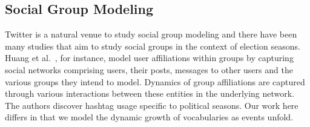 \begin{comment}
\subsection{Flawed Studies?}
Recent coverage of election forecasting using Twitter has been critical, e.g.,
see~\cite{metaxas2011not,gayo2012wanted}
These publications not only list pertinent problems
in using Twitter to forecast elections but also detail recommendations on how to make such methodologies better.
Gayo-Avello surveys %
the state-of-the-art approaches in predicting elections, 
most of which have been detailed above.
Gayo-Avello argues that post-hoc analysis of elections in retrospect must not count as valid predictions and that researchers 
must be wary of the \emph{file drawer} effect, i.e., the act of filing away negative results and publishing 
only the positive results. His major points of contention against such models are:
lack of explainability, no direct way to model a `vote' in social media, self-selection bias,
unrepresentativeness of Twitter demographics, lack of sophisticated sentiment modeling strategies
(e.g., to detect humor and sarcasm that abound in political conversations), and inability to capture
indifferences among the voting public (i.e., 
abstaining from tweeting about politics can carry as much signal as explicit mentions
of candidates). Finally, it has been shown that many of these models %
do not outperform a simple
base model that forecasts success for the incumbent.
Our approach here is to aid in better modeling of social groups and improve such predictions.
A truly comprehensive system will utilize social media as just one of its strategies in forecasting and
we do not make any claims of developing a universal forecasting system for elections.
\end{comment}

\subsection{Social Group Modeling}
Twitter is a natural venue to study social group modeling and there have been many studies that aim to
study social groups in the context of election seasons.
Huang et al.~\cite{huang2012social}, for instance,
model user affiliations within groups by capturing social networks comprising users, their posts,
messages to other users and the various groups they intend to model.
Dynamics of group affiliations are captured through various interactions between these entities in the underlying
network. The authors discover hashtag usage specific to political seasons.
Our work here differs in that we model the dynamic growth of vocabularies as events unfold.


